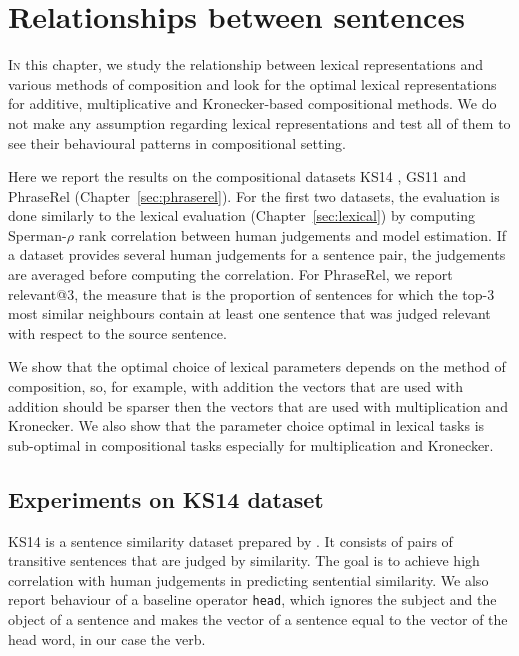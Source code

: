 \chapter{Relationships between sentences}
\label{sec:sentential}

\lettrine[lines=5,loversize=0.25]{I}{n} this chapter, we study the relationship between lexical representations and various methods of composition and look for the optimal lexical representations for additive, multiplicative and Kronecker-based compositional methods.\footnotemark{} We do not make any assumption regarding lexical representations and test all of them to see their behavioural patterns in compositional setting.


Here we report the results on the compositional datasets KS14 \cite{kartsadrqpl2014}, GS11 \cite{Grefenstette:2011:ETV:2140490.2140497} and PhraseRel (Chapter~\ref{sec:phraserel}). For the first two datasets, the evaluation is done similarly to the lexical evaluation (Chapter~\ref{sec:lexical}) by computing Sperman-$\rho$ rank correlation between human judgements and model estimation. If a dataset provides several human judgements for a sentence pair, the judgements are averaged before computing the correlation. For PhraseRel, we report relevant@3, the measure that is the proportion of sentences for which the top-3 most similar neighbours contain at least one sentence that was judged relevant with respect to the source sentence.

We show that the optimal choice of lexical parameters depends on the method of composition, so, for example, with addition the vectors that are used with addition should be sparser then the vectors that are used with multiplication and Kronecker. We also show that the parameter choice optimal in lexical tasks is sub-optimal in compositional tasks especially for multiplication and Kronecker. 

\section{Experiments on KS14 dataset}
\label{sec:ks14}

KS14 is a sentence similarity dataset prepared by \citet{kartsadrqpl2014}. It consists of pairs of transitive sentences that are judged by similarity. The goal is to achieve high correlation with human judgements in predicting sentential similarity. We also report behaviour of a baseline operator \texttt{head}, which ignores the subject and the object of a sentence and makes the vector of a sentence equal to the vector of the head word, in our case the verb.

